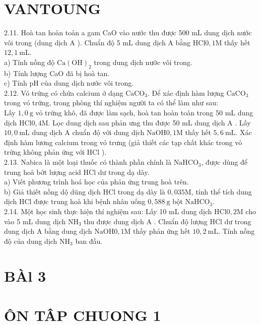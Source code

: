 \documentclass[10pt]{article}
\begin{document}
\section*{VANTOUNG}
2.11. Hoà tan hoàn toàn a gam CaO vào nước thu được 500 mL dung dịch nước vôi trong (dung dịch A ). Chuẩn độ 5 mL dung dịch A bằng $\mathrm{HCl} 0,1 \mathrm{M}$ thấy hết $12,1 \mathrm{~mL}$.\\
a) Tính nồng độ $\mathrm{Ca}(\mathrm{OH})_{2}$ trong dung dịch nước vôi trong.\\
b) Tính lượng CaO đã bị hoà tan.\\
c) Tính pH của dung dịch nước vôi trong.\\
2.12. Vó trứng có chứa calcium ở dạng $\mathrm{CaCO}_{3}$. Để xác định hàm lượng $\mathrm{CaCO}_{3}$ trong vó trứng, trong phòng thí nghiệm người ta có thể làm như sau:\\
Lấy $1,0 \mathrm{~g}$ vỏ trứng khô, đã được làm sạch, hoà tan hoàn toàn trong 50 mL dung dịch $\mathrm{HCl} 0,4 \mathrm{M}$. Lọc dung dịch sau phản ưng thu được 50 mL dung dịch A . Lấy $10,0 \mathrm{~mL}$ dung dịch A chuẩn độ với dung dịch $\mathrm{NaOH} 0,1 \mathrm{M}$ thấy hết $5,6 \mathrm{~mL}$. Xác định hàm lương calcium trong vỏ trưng (giả thiết các tạp chất khác trong vỏ trứng không phản ứng với HCl ).\\
2.13. Nabica là một loại thuốc có thành phần chính là $\mathrm{NaHCO}_{3}$, được dùng để trung hoà bớt lượng acid HCl dư trong dạ dày.\\
a) Viết phương trình hoá học của phản ứng trung hoà trên.\\
b) Giả thiết nồng dộ düng dịch HCl trong dạ dày là $0,035 \mathrm{M}$, tính thể tích dung dịch HCl được trung hoà khi bệnh nhân uống $0,588 \mathrm{~g}$ bột $\mathrm{NaHCO}_{3}$.\\
2.14. Một học sinh thực hiện thí nghiệm sau: Lấy 10 mL dung dịch $\mathrm{HCl} 0,2 \mathrm{M}$ cho vào 5 mL dung dịch $\mathrm{NH}_{3}$ thu được dung dịch A . Chuẩn độ lượng HCl dư trong dung dịch A bằng dung dịch $\mathrm{NaOH} 0,1 \mathrm{M}$ thấy phản ứng hết $10,2 \mathrm{~mL}$. Tính nồng độ của dung dịch $\mathrm{NH}_{3}$ ban đầu.

\section*{BÀl 3}
\section*{ÔN TÂP CHUONG 1}
\end{document}
